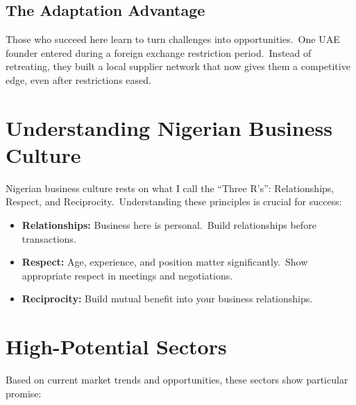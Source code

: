 \subsection{The Adaptation Advantage}\label{subsec:the-adaptation-advantage}
Those who succeed here learn to turn challenges into opportunities.\ One UAE founder entered during a foreign exchange restriction period.\ Instead of retreating, they built a local supplier network that now gives them a competitive edge, even after restrictions eased.

\section{Understanding Nigerian Business Culture}\label{sec:understanding-nigerian-business-culture}

Nigerian business culture rests on what I call the ``Three R's'': Relationships, Respect, and Reciprocity.\ Understanding these principles is crucial for success:

\begin{tcolorbox}[colback=white,colframe=primarydark,title=\textbf{The Three R's of Nigerian Business}]
\begin{itemize}
    \item \textbf{Relationships:} Business here is personal.\ Build relationships before transactions.
    \item \textbf{Respect:} Age, experience, and position matter significantly.\ Show appropriate respect in meetings and negotiations.
    \item \textbf{Reciprocity:}  Build mutual benefit into your business relationships.
\end{itemize}
\end{tcolorbox}

\section{High-Potential Sectors}\label{sec:high-potential-sectors}

Based on current market trends and opportunities, these sectors show particular promise:

